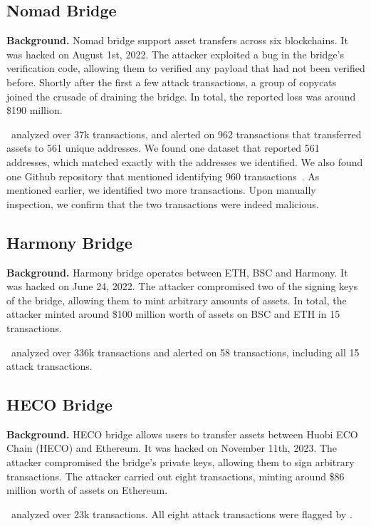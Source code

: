 \subsection{Nomad Bridge}
\textbf{Background.} Nomad bridge support asset transfers across six blockchains. It was hacked on August 1st, 2022. The attacker exploited a bug in the bridge's verification code, allowing them to verified any payload that had not been verified before. Shortly after the first a few attack transactions, a group of copycats joined the crusade of draining the bridge. In total, the reported loss was around \$190 million.

 \offlinetool~analyzed over 37k transactions, and alerted on 962 transactions that transferred assets to 561 unique addresses. We found one dataset that reported 561 addresses, which matched exactly with the addresses we identified. We also found one Github repository that mentioned identifying 960 transactions~\cite{nomad-groundtruth-github:online}. As mentioned earlier, we identified two more transactions. Upon manually inspection, we confirm that the two transactions were indeed malicious.

\subsection{Harmony Bridge}
\textbf{Background.} Harmony bridge operates between ETH, BSC and Harmony. It was hacked on June 24, 2022. The attacker compromised two of the signing keys of the bridge, allowing them to mint arbitrary amounts of assets. In total, the attacker minted around \$100 million worth of assets on BSC and ETH in 15 transactions.

 \offlinetool~analyzed over 336k transactions and alerted on 58 transactions, including all 15 attack transactions. 


\subsection{HECO Bridge}
\textbf{Background.} HECO bridge allows users to transfer assets between Huobi ECO Chain (HECO) and Ethereum. It was hacked on November 11th, 2023. The attacker compromised the bridge's private keys, allowing them to sign arbitrary transactions. The attacker carried out eight transactions, minting around \$86 million worth of assets on Ethereum.

 \offlinetool~analyzed over 23k transactions. All eight attack transactions were flagged by \offlinetool.


